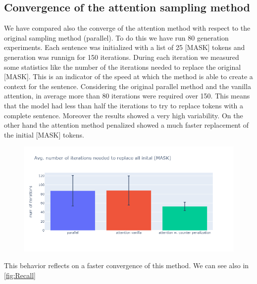 \documentclass[10pt,twocolumn,letterpaper]{article}
\begin{document}
\subsection{Convergence of the attention sampling method}
We have compared also the converge of the attention method with respect to the original sampling method (parallel).
To do this we have run 80 generation experiments. Each sentence was initialized with a list of 25 [MASK] tokens and
generation was runnign for 150 iterations. During each iteration we measured some statistics like the number of the
iterations needed to replace the original [MASK]. This is an indicator of the speed at which the method is able to create
a context for the sentence. Considering the original parallel method and the vanilla attention, in average more than 80
iterations were required over 150. This means that the model had less than half the iterations to try to replace tokens
with a complete sentence. Moreover the results showed a very high variability.
On the other hand the attention method penalized showed a much faster replacement of the initial [MASK] tokens.
\begin{figure}[t!]
   \centering
   \includegraphics[scale=0.3]{num_iter_replace_mask.png}
   \caption{
   }
   \label{fig:ReplaceMask}
\end{figure}

This behavior reflects on a faster convergence of this method. We can see also in \ref{fig:Recall}
\end{document}
